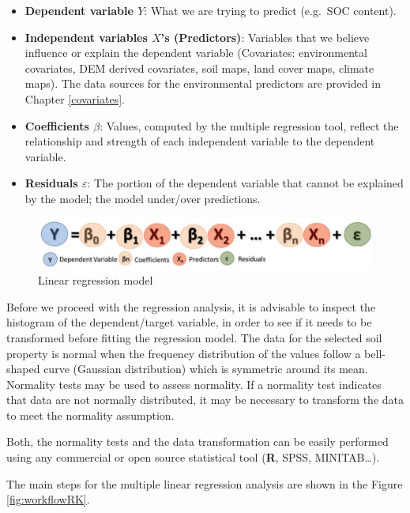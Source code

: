 \documentclass[10pt,b5paper,]{book}
\providecommand{\tightlist}{%
  \setlength{\itemsep}{0pt}\setlength{\parskip}{0pt}}
\theoremstyle{definition}
\theoremstyle{definition}
\theoremstyle{definition}
\theoremstyle{remark}
\begin{document}
\begin{itemize}
\tightlist
\item
  \textbf{Dependent variable \(Y\)}:  What we
  are trying to predict (e.g.~SOC content).
\item
  \textbf{Independent variables \(X\)'s (Predictors)}: Variables that we
  believe influence or explain the dependent variable (Covariates:
  environmental covariates, DEM derived covariates, soil maps, land
  cover maps, climate maps). The data sources for the environmental
  predictors are provided in Chapter \ref{covariates}.
\item
  \textbf{Coefficients \(\beta\)}: Values, computed by the multiple
  regression tool, reflect the relationship and strength of each
  independent variable to the dependent variable.
\item
  \textbf{Residuals \(\varepsilon\)}: The portion of the dependent
  variable that cannot be explained by the model; the model under/over
  predictions.
\end{itemize}

\begin{figure}
\centering
\includegraphics{images/RKequation.png}
\caption{Linear regression model}
\end{figure}

Before we proceed with the regression analysis, it is advisable to
inspect the histogram of the dependent/target variable, in order to see
if it needs to be transformed before fitting the regression model. The
data for the selected soil property is normal when the frequency
distribution of the values follow a bell-shaped curve (Gaussian
distribution) which is symmetric around its mean. Normality tests may be
used to assess normality. If a normality test indicates that data are
not normally distributed, it may be necessary to transform the data to
meet the normality assumption.

Both, the normality tests and the data transformation can be easily
performed using any commercial or open source statistical tool
(\textbf{R}, SPSS, MINITAB\ldots{}).

The main steps for the multiple linear regression analysis are shown in
the Figure \ref{fig:workflowRK}.
\end{document}
